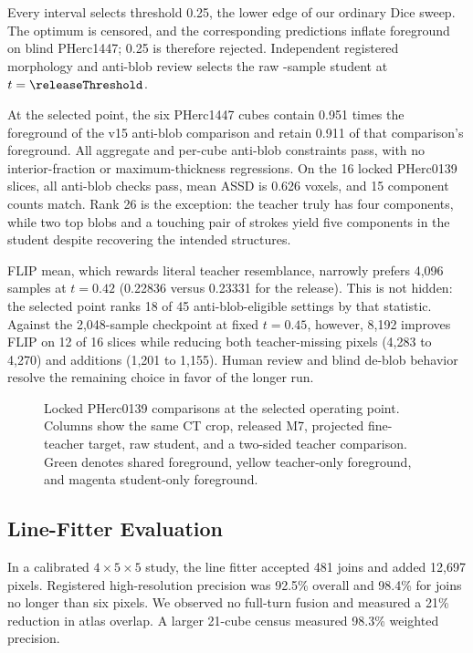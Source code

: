 Every interval selects threshold 0.25, the lower edge of our ordinary Dice
sweep. The optimum is censored, and the corresponding predictions inflate
foreground on blind PHerc1447; 0.25 is therefore rejected. Independent
registered morphology and anti-blob review selects the raw
\releaseSamplesText-sample student at $t=\releaseThreshold$.

At the selected point, the six PHerc1447 cubes contain 0.951 times the
foreground of the v15 anti-blob comparison and retain 0.911 of that comparison's
foreground. All aggregate and per-cube anti-blob constraints pass, with no
interior-fraction or maximum-thickness regressions. On the 16 locked PHerc0139
slices, all anti-blob checks pass, mean ASSD is 0.626 voxels, and 15 component
counts match. Rank 26 is the exception: the teacher truly has four components,
while two top blobs and a touching pair of strokes yield five components in the
student despite recovering the intended structures.

FLIP mean, which rewards literal teacher resemblance, narrowly prefers 4,096
samples at $t=0.42$ (0.22836 versus 0.23331 for the release). This is not hidden:
the selected point ranks 18 of 45 anti-blob-eligible settings by that statistic.
Against the 2,048-sample checkpoint at fixed $t=0.45$, however, 8,192 improves
FLIP on 12 of 16 slices while reducing both teacher-missing pixels
(4,283 to 4,270) and additions (1,201 to 1,155). Human review and blind de-blob
behavior resolve the remaining choice in favor of the longer run.

\begin{figure}[t]
  \centering
  \caption{Locked PHerc0139 comparisons at the selected operating point.
  Columns show the same CT crop, released M7, projected fine-teacher target, raw
  student, and a two-sided teacher comparison. Green denotes shared foreground,
  yellow teacher-only foreground, and magenta student-only foreground.}
  \label{fig:registered}
\end{figure}

\subsection{Line-Fitter Evaluation}

In a calibrated $4\!\times\!5\!\times\!5$ study, the line fitter accepted 481
joins and added 12,697 pixels.
Registered high-resolution precision was 92.5\% overall and 98.4\% for joins no
longer than six pixels.
We observed no full-turn fusion and measured a 21\% reduction in atlas overlap.
A larger 21-cube census measured 98.3\% weighted precision.


